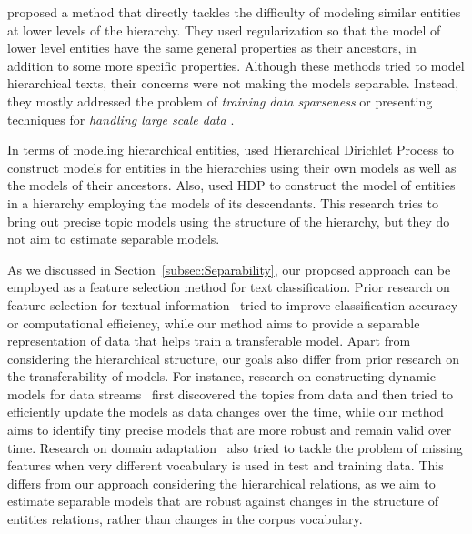 \citet{Zhou:2011} proposed a method that directly tackles the difficulty of modeling similar entities at lower levels of the hierarchy. They used regularization so that the model of lower level entities have the same general properties as their ancestors, in addition to some more specific properties. 
%
Although these methods tried to model hierarchical texts, their concerns were not making the models separable. Instead, they mostly addressed the problem of \emph{training data sparseness} \cite{Ha-Thuc:2011,Song:2014,McCallum:1998} or presenting techniques for \emph{handling large scale data} \cite{Gopal:2013,Oh:2011,Xue:2008,Ha-Thuc:2011}.

In terms of modeling hierarchical entities, \citet{Kim:2013} used Hierarchical Dirichlet Process \citep[HDP,][]{Teh:2006} to construct models for entities in the hierarchies using their own models as well as the models of their ancestors.  Also, \citet{Zavitsanos:2011} used HDP to construct the model of entities in a hierarchy employing the models of its descendants. This research tries to bring out precise topic models using the structure of the hierarchy, but they do not aim to estimate separable models.  

As we discussed in Section~\ref{subsec:Separability}, our proposed approach can be employed as a feature selection method for text classification. Prior research on feature selection for textual information~\citep{SIGIR-Workshop-2010,Forman:2003} tried to improve classification accuracy or computational efficiency, while our method aims to provide a separable representation of data that helps train a transferable model. 
Apart from considering the hierarchical structure, our goals also differ from prior research on the transferability of models. For instance, research on constructing dynamic models for data streams~\citep{Yao:2009,Blei:2006} first discovered the topics from data and then tried to efficiently update the models as data changes over the time, while our method aims to identify tiny precise models that are more robust and remain valid over time.  Research on domain adaptation~\citep{Xue:2008:plsa,Chen:2011} also tried to tackle the problem of missing features when very different vocabulary is used in test and training data.  This differs from our approach considering the hierarchical relations, as we aim to estimate separable models that are robust against changes in the structure of entities relations, rather than changes in the corpus vocabulary.